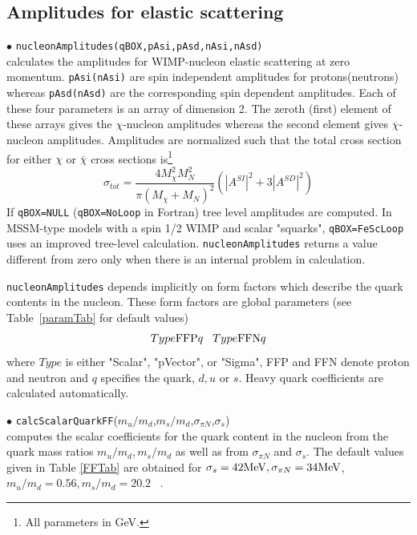 \documentclass[12pt,a4paper]{article}
\begin{document}
\subsection{Amplitudes for elastic scattering}
\noindent
 $\bullet$ \verb|nucleonAmplitudes(qBOX,pAsi,pAsd,nAsi,nAsd)|\\
calculates the amplitudes for WIMP-nucleon elastic
scattering at zero momentum. \verb|pAsi(nAsi)| are spin
independent amplitudes for protons(neutrons) whereas
\verb|pAsd(nAsd)| are the corresponding spin dependent amplitudes.
Each of these four parameters is an array of 
dimension 2. The zeroth (first) element of these arrays gives the
$\chi$-nucleon amplitudes whereas the second element gives
$\overline{\chi}$-nucleon amplitudes. Amplitudes are normalized
such that the total cross section for either $\chi$ or $\overline
\chi$ cross sections is\footnote{All parameters in GeV.}
\begin{equation}
\sigma_{tot}=\frac{4M_{\chi}^2 M_N^2}{\pi(M_{\chi}+M_N)^2}(|A^{SI}|^2+3|A^{SD}|^2)
\label{eq:norm}
\end{equation}
If \verb|qBOX=NULL| (\verb|qBOX=NoLoop| in Fortran) tree level amplitudes are computed. 
In MSSM-type models with a spin 1/2 WIMP and scalar "squarks",   
\verb|qBOX=FeScLoop| uses  an improved tree-level calculation.  
\verb|nucleonAmplitudes| returns a value different from zero only
when there is an internal problem in calculation.


\verb|nucleonAmplitudes| depends implicitly on form factors which describe the 
quark contents in the nucleon. These form factors are global parameters (see
Table~\ref{paramTab} for
default values)
\begin{equation}
Type{\rm FFP}q \;\;\; Type{\rm FFN}q \nonumber
\end{equation} 
where $Type$ is either "Scalar", "pVector", or "Sigma",  FFP and FFN denote proton and neutron  and
$q$ specifies the quark, $d,u$  or $s$. Heavy quark coefficients are calculated automatically.


\noindent$\bullet$
{\tt calcScalarQuarkFF}($m_u/m_d$,$m_s/m_d$,$\sigma_{\pi N}$,$\sigma_s$)\\
computes the scalar coefficients for the quark content in the nucleon from the quark mass ratios
$m_u/m_d, m_s/m_d$ as well as from $\sigma_{\pi N}$ and $\sigma_s$.
The default values given in Table  \ref{FFTab} are obtained for 
$\sigma_s=42{\rm MeV},\sigma_{\pi N}=34{\rm MeV}$, $m_u/m_d=0.56, m_s/m_d=20.2$ ~\cite{Beringer:1900zz}.
\end{document}
